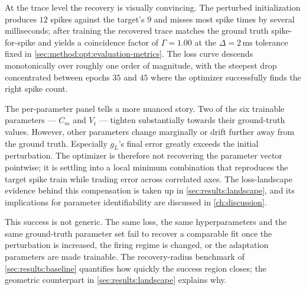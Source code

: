 At the trace level the recovery is visually convincing.
The perturbed initialization produces $12$ spikes against the target's $9$ and misses most spike times by several milliseconds;
after training the recovered trace matches the ground truth spike-for-spike and yields a coincidence factor of $\Gamma = 1.00$ at the $\Delta = 2\,\text{ms}$ tolerance fixed in \cref{sec:method:opt:evaluation-metrics}.
The loss curve descends monotonically over roughly one order of magnitude, with the steepest drop concentrated between epochs $35$ and $45$ where the optimizer successfully finds the right spike count.

The per-parameter panel tells a more nuanced story.
Two of the six trainable parameters --- $C_m$ and $V_{\text{r}}$ --- tighten substantially towards their ground-truth values.
However, other parameters change marginally or drift further away from the ground truth.
Especially $g_L$'s final error greatly exceeds the initial perturbation.
The optimizer is therefore not recovering the parameter vector pointwise;
it is settling into a local minimum combination that reproduces the target spike train while trading error across correlated axes.
The loss-landscape evidence behind this compensation is taken up in \cref{sec:results:landscape}, and its implications for parameter identifiability are discussed in \cref{ch:discussion}.

This success is not generic.
The same loss, the same hyperparameters and the same ground-truth parameter set fail to recover a comparable fit once the perturbation is increased,
the firing regime is changed, or the adaptation parameters are made trainable.
The recovery-radius benchmark of \cref{sec:results:baseline} quantifies how quickly the success region closes;
the geometric counterpart in \cref{sec:results:landscape} explains why.


